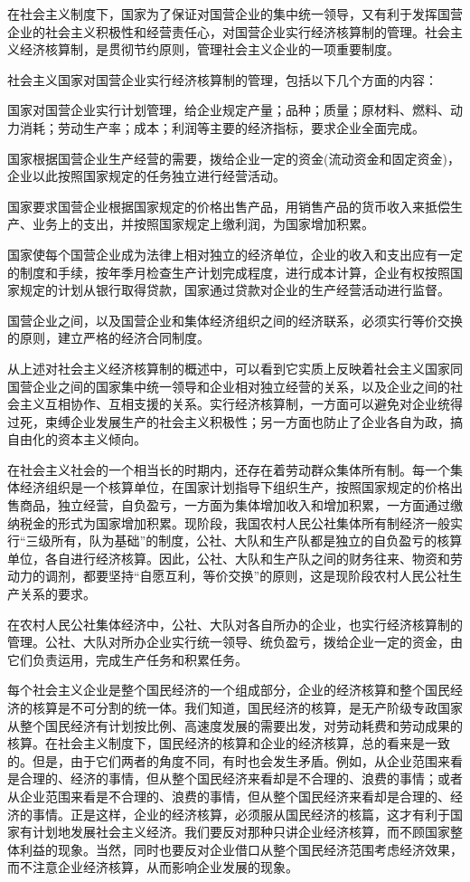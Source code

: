 \documentclass{book}
\begin{document}
在社会主义制度下，国家为了保证对国营企业的集中统一领导，又有利于发挥国营企业的社会主义积极性和经营责任心，对国营企业实行经济核算制的管理。社会主义经济核算制，是贯彻节约原则，管理社会主义企业的一项重要制度。

社会主义国家对国营企业实行经济核算制的管理，包括以下几个方面的内容：

国家对国营企业实行计划管理，给企业规定产量；品种；质量；原材料、燃料、动力消耗；劳动生产率；成本；利润等主要的经济指标，要求企业全面完成。

国家根据国营企业生产经营的需要，拨给企业一定的资金(流动资金和固定资金)，企业以此按照国家规定的任务独立进行经营活动。

国家要求国营企业根据国家规定的价格出售产品，用销售产品的货币收入来抵偿生产、业务上的支出，并按照国家规定上缴利润，为国家增加积累。

国家使每个国营企业成为法律上相对独立的经济单位，企业的收入和支出应有一定的制度和手续，按年季月检查生产计划完成程度，进行成本计算，企业有权按照国家规定的计划从银行取得贷款，国家通过贷款对企业的生产经营活动进行监督。

国营企业之间，以及国营企业和集体经济组织之间的经济联系，必须实行等价交换的原则，建立严格的经济合同制度。

从上述对社会主义经济核算制的概述中，可以看到它实质上反映着社会主义国家同国营企业之间的国家集中统一领导和企业相对独立经营的关系，以及企业之间的社会主义互相协作、互相支援的关系。实行经济核算制，一方面可以避免对企业统得过死，束缚企业发展生产的社会主义积极性；另一方面也防止了企业各自为政，搞自由化的资本主义倾向。

在社会主义社会的一个相当长的时期内，还存在着劳动群众集体所有制。每一个集体经济组织是一个核算单位，在国家计划指导下组织生产，按照国家规定的价格出售商品，独立经营，自负盈亏，一方面为集体增加收入和增加积累，一方面通过缴纳税金的形式为国家增加积累。现阶段，我国农村人民公社集体所有制经济一般实行“三级所有，队为基础”的制度，公社、大队和生产队都是独立的自负盈亏的核算单位，各自进行经济核算。因此，公社、大队和生产队之间的财务往来、物资和劳动力的调剂，都要坚持“自愿互利，等价交换”的原则，这是现阶段农村人民公社生产关系的要求。

在农村人民公社集体经济中，公社、大队对各自所办的企业，也实行经济核算制的管理。公社、大队对所办企业实行统一领导、统负盈亏，拨给企业一定的资金，由它们负责运用，完成生产任务和积累任务。

每个社会主义企业是整个国民经济的一个组成部分，企业的经济核算和整个国民经济的核算是不可分割的统一体。我们知道，国民经济的核算，是无产阶级专政国家从整个国民经济有计划按比例、高速度发展的需要出发，对劳动耗费和劳动成果的核算。在社会主义制度下，国民经济的核算和企业的经济核算，总的看来是一致的。但是，由于它们两者的角度不同，有时也会发生矛盾。例如，从企业范围来看是合理的、经济的事情，但从整个国民经济来看却是不合理的、浪费的事情；或者从企业范围来看是不合理的、浪费的事情，但从整个国民经济来看却是合理的、经济的事情。正是这样，企业的经济核算，必须服从国民经济的核篇，这才有利于国家有计划地发展社会主义经济。我们要反对那种只讲企业经济核算，而不顾国家整体利益的现象。当然，同时也要反对企业借口从整个国民经济范围考虑经济效果，而不注意企业经济核算，从而影响企业发展的现象。
\end{document}
